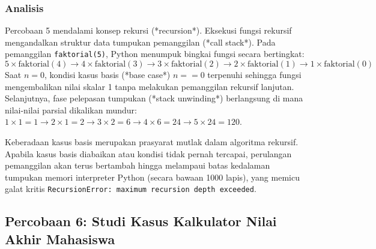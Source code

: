 \documentclass[12pt,a4paper]{article}
\begin{document}
\subsubsection{Analisis}
Percobaan 5 mendalami konsep rekursi (*recursion*). Eksekusi fungsi rekursif mengandalkan struktur data tumpukan pemanggilan (*call stack*). Pada pemanggilan \texttt{faktorial(5)}, Python menumpuk bingkai fungsi secara bertingkat:
\begin{equation}
5 \times \text{faktorial}(4) \to 4 \times \text{faktorial}(3) \to 3 \times \text{faktorial}(2) \to 2 \times \text{faktorial}(1) \to 1 \times \text{faktorial}(0)
\end{equation}
Saat $n = 0$, kondisi kasus basis (*base case*) $n == 0$ terpenuhi sehingga fungsi mengembalikan nilai skalar 1 tanpa melakukan pemanggilan rekursif lanjutan. Selanjutnya, fase pelepasan tumpukan (*stack unwinding*) berlangsung di mana nilai-nilai parsial dikalikan mundur: $1 \times 1 = 1 \to 2 \times 1 = 2 \to 3 \times 2 = 6 \to 4 \times 6 = 24 \to 5 \times 24 = 120$.

Keberadaan kasus basis merupakan prasyarat mutlak dalam algoritma rekursif. Apabila kasus basis diabaikan atau kondisi tidak pernah tercapai, perulangan pemanggilan akan terus bertambah hingga melampaui batas kedalaman tumpukan memori interpreter Python (secara bawaan 1000 lapis), yang memicu galat kritis \texttt{RecursionError: maximum recursion depth exceeded}.

\subsection{Percobaan 6: Studi Kasus Kalkulator Nilai Akhir Mahasiswa}
\end{document}
